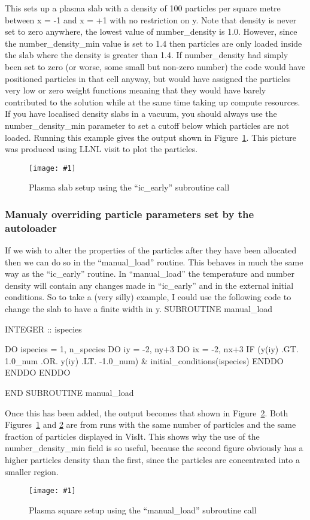 \documentclass[12pt,a4paper]{article}
\newcommand{\scaledcapimage}[4]
  {{\begin{figure}[hbt!]\centering\texttt{[image: \#1]}\caption{#3}
    \label{#2} \end{figure}}}
\newenvironment{boxverbatim}{\lboxverbatim{none}}{\endlboxverbatim}
\begin{document}
This sets up a plasma slab with a density of 100 particles per square metre
between x = -1 and x = +1 with no restriction on y. Note that density is never
set to zero anywhere, the lowest value of number\_density is 1.0. However, since the number\_density\_min
value is set to 1.4 then particles are only loaded inside the slab where the
density is greater than 1.4. If number\_density had simply been set to zero (or worse,
some small but non-zero number) the code would have positioned particles in
that cell anyway, but would have assigned the particles very low or zero
weight functions meaning that they would have barely contributed to the
solution while at the same time taking up compute resources. If you have
localised density slabs in a vacuum, you should always use the number\_density\_min
parameter to set a cutoff below which particles are not loaded. Running this
example gives the output shown in Figure~\ref{slab}. This picture was produced
using LLNL visit to plot the particles.\\
\scaledcapimage{./images/example}{slab}{Plasma slab setup using the
  ``ic\_early'' subroutine call}{0.4}

\subsubsection{Manualy overriding particle parameters set by the autoloader}
\label{sec:manualload}
If we wish to alter the properties of the particles after they have been
allocated then we can do so in the ``manual\_load'' routine. This behaves
in much the same way as the ``ic\_early'' routine. In ``manual\_load'' the
temperature and number density will contain
any changes made in ``ic\_early''
and in the external initial conditions. So to take a (very silly) example, I
could use the following code to change the slab to have a finite width in y.
\begin{boxverbatim}
  SUBROUTINE manual_load

    INTEGER :: ispecies

    DO ispecies = 1, n_species
      DO iy = -2, ny+3
        DO ix = -2, nx+3
          IF (y(iy) .GT. 1.0_num .OR. y(iy) .LT. -1.0_num) &
              initial_conditions(ispecies)%
        ENDDO
      ENDDO
    ENDDO

  END SUBROUTINE manual_load
\end{boxverbatim}

Once this has been added, the output becomes that shown in Figure~\ref{square}.
Both Figures~\ref{slab} and \ref{square} are from runs with the same number of
particles and the same fraction of particles displayed in VisIt. This shows
why the use of the number\_density\_min field is so useful, because the second figure
obviously has a higher particles density than the first, since the particles
are concentrated into a smaller region.
\scaledcapimage{./images/example2}{square}{Plasma square setup using the
  ``manual\_load'' subroutine call}{0.4}
\end{document}
